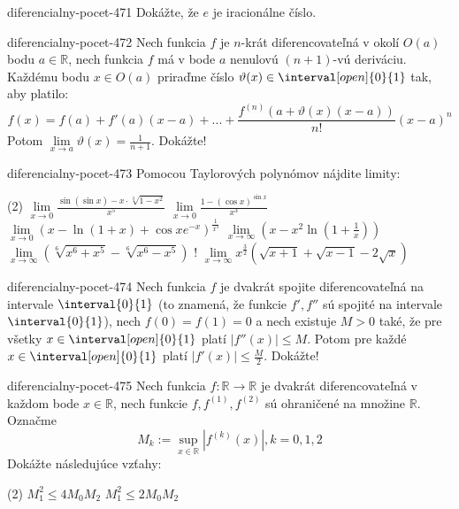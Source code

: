 \begin{defproblem}{diferencialny-pocet-471}
Dokážte, že $e$ je iracionálne číslo.
\end{defproblem}

\begin{defproblem}{diferencialny-pocet-472}
Nech funkcia $f$ je $n$-krát diferencovateľná v okolí $O(a)$ bodu $a \in
\mathbb{R}$, nech funkcia $f$ má v bode $a$ nenulovú $(n+1)$-vú deriváciu.
Každému bodu $x\in O(a)$ priraďme číslo $\vartheta (x)\in \interval[open]{0}{1}$
tak, aby platilo:
\[
  f(x) = f(a)+f'(a)(x-a) + ... + \frac{f^{(n)}(a+\vartheta (x)(x-a))}{n!}(x-a)^n
\]
Potom $\lim\limits_{x \rightarrow a}\vartheta (x) = \frac{1}{n+1}$. Dokážte!
\end{defproblem}

\begin{defproblem}{diferencialny-pocet-473}
Pomocou Taylorových polynómov nájdite limity:
\begin{tasks}(2)
  \task $\lim\limits_{x \rightarrow 0}\frac{\sin (\sin x)-x\cdot\sqrt[3]{1-x^2}}{x^5}$
  \task $\lim\limits_{x \rightarrow 0}\frac{1-(\cos x)^{\sin x}}{x^3}$
  \task $\lim\limits_{x \rightarrow 0}(x-\ln (1+x)+\cos xe^{-x})^{\frac{1}{x^3}}$
  \task $\lim\limits_{x \rightarrow \infty}(x-x^2\ln (1+\frac{1}{x}))$
  \task $\lim\limits_{x \rightarrow \infty}(\sqrt[6]{x^6+x^5}-\sqrt[6]{x^6-x^5})$
  \task! $\lim\limits_{x \rightarrow \infty}x^{\frac{3}{2}}(\sqrt{x+1}+\sqrt{x-1}-2\sqrt{x})$
\end{tasks}
\end{defproblem}

\begin{defproblem}{diferencialny-pocet-474}
Nech funkcia $f$ je dvakrát spojite diferencovateľná na intervale
$\interval{0}{1}$ (to znamená, že funkcie $f',f''$ sú spojité na intervale
$\interval{0}{1}$), nech $f(0)=f(1)=0$ a nech existuje $M>0$ také, že pre všetky
$x\in \interval[open]{0}{1}$ platí $|f''(x)|\leq M$. Potom pre každé $x\in
\interval[open]{0}{1}$ platí $|f'(x)|\leq \frac{M}{2}$. Dokážte!
\end{defproblem}

\begin{defproblem}{diferencialny-pocet-475}
Nech funkcia $f:\mathbb{R} \rightarrow \mathbb{R}$ je dvakrát diferencovateľná v
každom bode $x\in\mathbb{R}$, nech funkcie $f,f^{(1)},f^{(2)}$ sú ohraničené na
množine $\mathbb{R}$. Označme
\[
  M_k := \sup\limits_{x \in \mathbb{R}} | f^{(k)}(x) |, k=0,1,2
\]
Dokážte následujúce vzťahy:
\begin{tasks}(2)
\task $M^2_1\leq 4M_0M_2$
\task $M^2_1\leq 2M_0M_2$
\end{tasks}
\end{defproblem}

